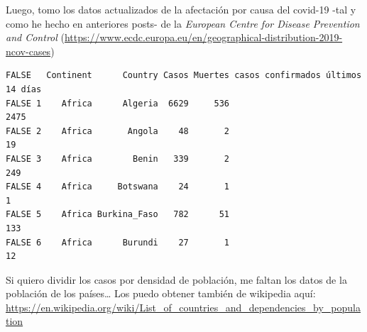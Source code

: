 \documentclass[
]{article}
\newenvironment{Shaded}{\begin{snugshade}}{\end{snugshade}}
\newcommand{\CommentTok}[1]{\textcolor[rgb]{0.56,0.35,0.01}{\textit{#1}}}
\newcommand{\DataTypeTok}[1]{\textcolor[rgb]{0.13,0.29,0.53}{#1}}
\newcommand{\DecValTok}[1]{\textcolor[rgb]{0.00,0.00,0.81}{#1}}
\newcommand{\KeywordTok}[1]{\textcolor[rgb]{0.13,0.29,0.53}{\textbf{#1}}}
\newcommand{\NormalTok}[1]{#1}
\newcommand{\OperatorTok}[1]{\textcolor[rgb]{0.81,0.36,0.00}{\textbf{#1}}}
\newcommand{\OtherTok}[1]{\textcolor[rgb]{0.56,0.35,0.01}{#1}}
\newcommand{\StringTok}[1]{\textcolor[rgb]{0.31,0.60,0.02}{#1}}
\begin{document}
Luego, tomo los datos actualizados de la afectación por causa del
covid-19 -tal y como he hecho en anteriores posts- de la \emph{European
Centre for Disease Prevention and Control}
(\url{https://www.ecdc.europa.eu/en/geographical-distribution-2019-ncov-cases})

\begin{Shaded}
\end{Shaded}

\begin{verbatim}
FALSE   Continent      Country Casos Muertes casos confirmados últimos 14 días
FALSE 1    Africa      Algeria  6629     536                              2475
FALSE 2    Africa       Angola    48       2                                19
FALSE 3    Africa        Benin   339       2                               249
FALSE 4    Africa     Botswana    24       1                                 1
FALSE 5    Africa Burkina_Faso   782      51                               133
FALSE 6    Africa      Burundi    27       1                                12
\end{verbatim}

Si quiero dividir los casos por densidad de población, me faltan los
datos de la población de los países\ldots{} Los puedo obtener también de
wikipedia aquí:
\url{https://en.wikipedia.org/wiki/List_of_countries_and_dependencies_by_population}
\end{document}
